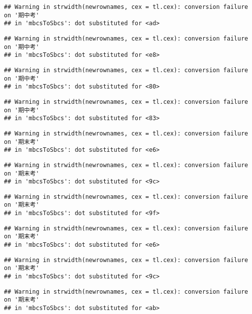 \documentclass[
]{book}
\begin{document}
\begin{verbatim}
## Warning in strwidth(newrownames, cex = tl.cex): conversion failure on '期中考'
## in 'mbcsToSbcs': dot substituted for <ad>
\end{verbatim}

\begin{verbatim}
## Warning in strwidth(newrownames, cex = tl.cex): conversion failure on '期中考'
## in 'mbcsToSbcs': dot substituted for <e8>
\end{verbatim}

\begin{verbatim}
## Warning in strwidth(newrownames, cex = tl.cex): conversion failure on '期中考'
## in 'mbcsToSbcs': dot substituted for <80>
\end{verbatim}

\begin{verbatim}
## Warning in strwidth(newrownames, cex = tl.cex): conversion failure on '期中考'
## in 'mbcsToSbcs': dot substituted for <83>
\end{verbatim}

\begin{verbatim}
## Warning in strwidth(newrownames, cex = tl.cex): conversion failure on '期末考'
## in 'mbcsToSbcs': dot substituted for <e6>
\end{verbatim}

\begin{verbatim}
## Warning in strwidth(newrownames, cex = tl.cex): conversion failure on '期末考'
## in 'mbcsToSbcs': dot substituted for <9c>
\end{verbatim}

\begin{verbatim}
## Warning in strwidth(newrownames, cex = tl.cex): conversion failure on '期末考'
## in 'mbcsToSbcs': dot substituted for <9f>
\end{verbatim}

\begin{verbatim}
## Warning in strwidth(newrownames, cex = tl.cex): conversion failure on '期末考'
## in 'mbcsToSbcs': dot substituted for <e6>
\end{verbatim}

\begin{verbatim}
## Warning in strwidth(newrownames, cex = tl.cex): conversion failure on '期末考'
## in 'mbcsToSbcs': dot substituted for <9c>
\end{verbatim}

\begin{verbatim}
## Warning in strwidth(newrownames, cex = tl.cex): conversion failure on '期末考'
## in 'mbcsToSbcs': dot substituted for <ab>
\end{verbatim}
\end{document}
